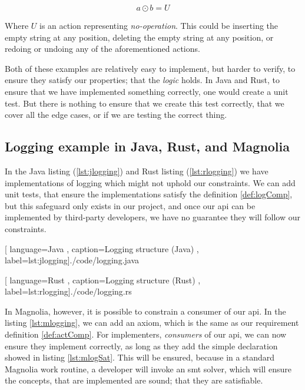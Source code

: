 \begin{definition} \label{def:actComp}
  \begin{equation}
    a \odot b = U
  \end{equation}
\end{definition}

Where $U$ is an action representing \textit{no-operation}. This could be
inserting the empty string at any position, deleting the empty string at any
position, or redoing or undoing any of the aforementioned actions.

Both of these examples are relatively easy to implement, but harder to verify,
to ensure they satisfy our properties; that the \textit{logic} holds. In Java
and Rust, to ensure that we have implemented something correctly, one would
create a unit test. But there is nothing to ensure that we create this test
correctly, that we cover all the edge cases, or if we are testing the correct
thing.

\subsection{Logging example in Java, Rust, and Magnolia}

In the Java listing (\ref{lst:jlogging}) and Rust listing (\ref{lst:rlogging})
we have implementations of logging which might not uphold our constraints. We
can add unit tests, that ensure the implementations satisfy the definition
\ref{def:logComp}, but this safeguard only exists in our project, and once our
\gls*{api} can be implemented by third-party developers, we have no guarantee
they will follow our constraints.

\begin{center}
  
    [ language=Java
    , caption={Logging structure (Java)}
    , label=lst:jlogging]{./code/logging.java}
\end{center}

\begin{center}
  
    [ language=Rust
    , caption={Logging structure (Rust)}
    , label=lst:rlogging]{./code/logging.rs}
\end{center}

In Magnolia, however, it is possible to constrain a consumer of our \gls*{api}.
In the listing \ref{lst:mlogging}, we can add an axiom, which is the same as our
requirement definition \ref{def:actComp}. For implementers, \textit{consumers}
of our \gls*{api}, we can now ensure they implement correctly, as long as they
add the simple declaration showed in listing \ref{lst:mlogSat}. This will be
ensured, because in a standard Magnolia work routine, a developer will invoke an
\gls*{smt} solver, which will ensure the concepts, that are implemented are
sound; that they are satisfiable.

